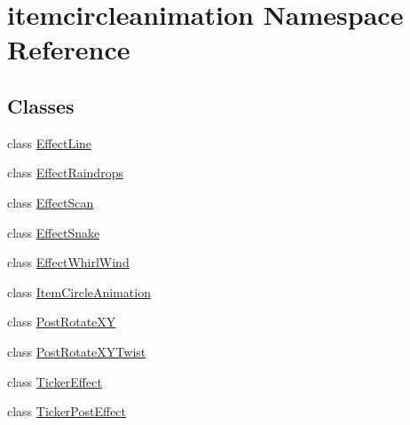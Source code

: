 \hypertarget{namespaceitemcircleanimation}{}\section{itemcircleanimation Namespace Reference}
\label{namespaceitemcircleanimation}
\subsection*{Classes}
\begin{DoxyCompactItemize}
\item 
class \hyperlink{classitemcircleanimation_1_1EffectLine}{Effect\+Line}
\item 
class \hyperlink{classitemcircleanimation_1_1EffectRaindrops}{Effect\+Raindrops}
\item 
class \hyperlink{classitemcircleanimation_1_1EffectScan}{Effect\+Scan}
\item 
class \hyperlink{classitemcircleanimation_1_1EffectSnake}{Effect\+Snake}
\item 
class \hyperlink{classitemcircleanimation_1_1EffectWhirlWind}{Effect\+Whirl\+Wind}
\item 
class \hyperlink{classitemcircleanimation_1_1ItemCircleAnimation}{Item\+Circle\+Animation}
\item 
class \hyperlink{classitemcircleanimation_1_1PostRotateXY}{Post\+Rotate\+X\+Y}
\item 
class \hyperlink{classitemcircleanimation_1_1PostRotateXYTwist}{Post\+Rotate\+X\+Y\+Twist}
\item 
class \hyperlink{classitemcircleanimation_1_1TickerEffect}{Ticker\+Effect}
\item 
class \hyperlink{classitemcircleanimation_1_1TickerPostEffect}{Ticker\+Post\+Effect}
\end{DoxyCompactItemize}
